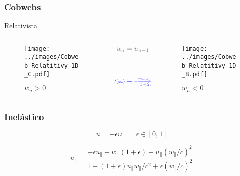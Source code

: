 \documentclass{beamer}
\begin{document}
\begin{frame}
    \frametitle[prueb1]{Cobwebs}{Relativista}
    \centering
    \begin{columns}
        \begin{column}{0.4\textwidth}
            \vspace{0.cm}
            \begin{figure}
                \centering
                \texttt{[image: ../images/Cobweb\_Relatitivy\_1D\_C.pdf]}
                \caption{$w_n>0$}
            \end{figure}  
        \end{column}
        \begin{column}{0.2\textwidth}
            \centering
            \begin{align*}
                \color{gray} u_n &\color{gray} =  u_{n-1} \\[1cm]
                \color{blue} \scalebox{0.6}{ $f(u_n)$} &\color{blue} = \scalebox{0.6}{$-\dfrac{-u_{n-1} + 2w_n - u_{n-1}(w_n/c)^2}{1 - 2w_n u_{n-1}/c^2 + (w_n/c)^2}$}
            \end{align*}
        \end{column}
        \begin{column}{0.4\textwidth}
            \begin{figure}
                \centering
                \texttt{[image: ../images/Cobweb\_Relatitivy\_1D\_B.pdf]}
                \caption{$w_n<0$}
            \end{figure}  
        \end{column}
    \end{columns}
\end{frame}

\begin{frame}
    \frametitle[prueb1]{Inelástico}
    \begin{equation*}
        \bar{u} = -\epsilon u \qquad \epsilon \in \left[ 0, 1 \right]
    \end{equation*}
    \begin{equation*}
        \bar{u}_\parallel = \dfrac{-\epsilon u_\parallel + w_\parallel (1 + \epsilon) -  u_\parallel (w_\parallel/c)^2}{1 - (1 + \epsilon)u_\parallel w_\parallel/c^2 + \epsilon (w_\parallel/c)^2}
    \end{equation*}
\end{frame}
\end{document}
